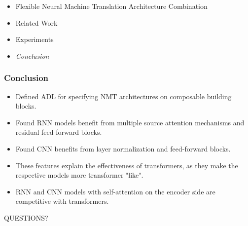 \begin{frame}

\begin{itemize}
    \item Flexible Neural Machine Translation Architecture Combination
    \item Related Work
    \item Experiments
    \item \emph{\color{UOYellow}Conclusion}
\end{itemize}

\end{frame}

\begin{frame}
    \frametitle{Conclusion}
    \begin{itemize}
        \item Defined ADL for specifying NMT architectures on composable
            building blocks.
        \item Found RNN models benefit from multiple source attention mechanisms
            and residual feed-forward blocks.
        \item Found CNN benefits from layer normalization and feed-forward
            blocks.
        \item These features explain the effectiveness of transformers, as they
            make the respective models more transformer "like". 
        \item RNN and CNN models with self-attention on the encoder side are
            competitive with transformers. 
    \end{itemize}
\end{frame}

\begin{frame}
    \centering
    QUESTIONS?
\end{frame}
